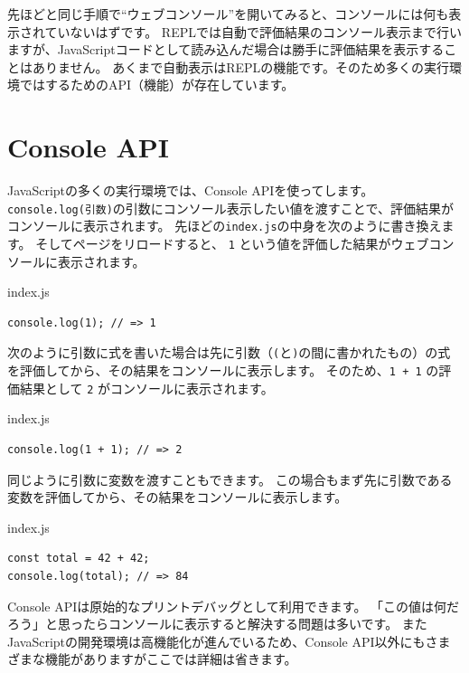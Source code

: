 先ほどと同じ手順で``ウェブコンソール''を開いてみると、コンソールには何も表示されていないはずです。
REPLでは自動で評価結果のコンソール表示まで行いますが、JavaScriptコードとして読み込んだ場合は勝手に評価結果を表示することはありません。
あくまで自動表示はREPLの機能です。そのため多くの実行環境では\textbf{}するためのAPI（機能）が存在しています。

\hypertarget{console-api}{%
\section{Console API}\label{console-api}}

JavaScriptの多くの実行環境では、Console
APIを使って\textbf{}します。
\texttt{console.log(引数)}の引数にコンソール表示したい値を渡すことで、評価結果がコンソールに表示されます。
\newpage
先ほどの\texttt{index.js}の中身を次のように書き換えます。
そしてページをリロードすると、 \texttt{1}
という値を評価した結果がウェブコンソールに表示されます。

\begin{listtitle}
index.js
\end{listtitle}
\begin{lstlisting}
console.log(1); // => 1
\end{lstlisting}
\listend

次のように引数に式を書いた場合は先に引数（\texttt{(}と\texttt{)}の間に書かれたもの）の式を評価してから、その結果をコンソールに表示します。
そのため、\texttt{1 + 1} の評価結果として
\texttt{2} がコンソールに表示されます。

\begin{listtitle}
index.js
\end{listtitle}
\begin{lstlisting}
console.log(1 + 1); // => 2
\end{lstlisting}
\listend

同じように引数に変数を渡すこともできます。
この場合もまず先に引数である変数を評価してから、その結果をコンソールに表示します。

\begin{listtitle}
index.js
\end{listtitle}
\begin{lstlisting}
const total = 42 + 42;
console.log(total); // => 84
\end{lstlisting}
\listend

Console APIは原始的なプリントデバッグとして利用できます。
「この値は何だろう」と思ったらコンソールに表示すると解決する問題は多いです。
またJavaScriptの開発環境は高機能化が進んでいるため、Console
API以外にもさまざまな機能がありますがここでは詳細は省きます。


